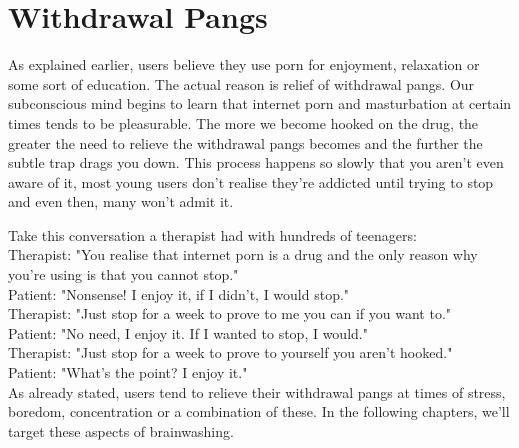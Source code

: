 \documentclass[easypeasy.tex]{subfiles}
\begin{document}
\section{Withdrawal Pangs}

As explained earlier, users believe they use porn for enjoyment, relaxation or some sort of education. The actual reason is relief of withdrawal pangs. Our subconscious mind begins to learn that internet porn and masturbation at certain times tends to be pleasurable. The more we become hooked on the drug, the greater the need to relieve the withdrawal pangs becomes and the further the subtle trap drags you down. This process happens so slowly that you aren't even aware of it, most young users don't realise they're addicted until trying to stop and even then, many won't admit it.

Take this conversation a therapist had with hundreds of teenagers: \\
  Therapist: "You realise that internet porn is a drug and the only reason why you're using is that you cannot stop." \\
  Patient: "Nonsense! I enjoy it, if I didn't, I would stop." \\
  Therapist: "Just stop for a week to prove to me you can if you want to." \\
  Patient: "No need, I enjoy it. If I wanted to stop, I would." \\
  Therapist: "Just stop for a week to prove to yourself you aren't hooked." \\
  Patient: "What's the point? I enjoy it." \\

As already stated, users tend to relieve their withdrawal pangs at times of stress, boredom, concentration or a combination of these. In the following chapters, we'll target these aspects of brainwashing.
\end{document}
